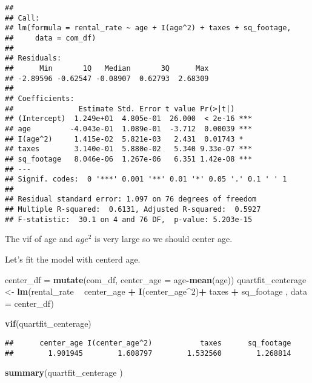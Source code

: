 \documentclass[]{article}
\newenvironment{Shaded}{\begin{snugshade}}{\end{snugshade}}
\newcommand{\DataTypeTok}[1]{\textcolor[rgb]{0.13,0.29,0.53}{#1}}
\newcommand{\DecValTok}[1]{\textcolor[rgb]{0.00,0.00,0.81}{#1}}
\newcommand{\KeywordTok}[1]{\textcolor[rgb]{0.13,0.29,0.53}{\textbf{#1}}}
\newcommand{\NormalTok}[1]{#1}
\newcommand{\OperatorTok}[1]{\textcolor[rgb]{0.81,0.36,0.00}{\textbf{#1}}}
\newcommand{\StringTok}[1]{\textcolor[rgb]{0.31,0.60,0.02}{#1}}
\begin{document}
\begin{verbatim}
## 
## Call:
## lm(formula = rental_rate ~ age + I(age^2) + taxes + sq_footage, 
##     data = com_df)
## 
## Residuals:
##      Min       1Q   Median       3Q      Max 
## -2.89596 -0.62547 -0.08907  0.62793  2.68309 
## 
## Coefficients:
##               Estimate Std. Error t value Pr(>|t|)    
## (Intercept)  1.249e+01  4.805e-01  26.000  < 2e-16 ***
## age         -4.043e-01  1.089e-01  -3.712  0.00039 ***
## I(age^2)     1.415e-02  5.821e-03   2.431  0.01743 *  
## taxes        3.140e-01  5.880e-02   5.340 9.33e-07 ***
## sq_footage   8.046e-06  1.267e-06   6.351 1.42e-08 ***
## ---
## Signif. codes:  0 '***' 0.001 '**' 0.01 '*' 0.05 '.' 0.1 ' ' 1
## 
## Residual standard error: 1.097 on 76 degrees of freedom
## Multiple R-squared:  0.6131, Adjusted R-squared:  0.5927 
## F-statistic:  30.1 on 4 and 76 DF,  p-value: 5.203e-15
\end{verbatim}

The vif of age and \(age^2\) is very large so we should center age.

Let's fit the model with centerd age.

\begin{Shaded}
\begin{Highlighting}[]
\NormalTok{center_df =}\StringTok{ }\KeywordTok{mutate}\NormalTok{(com_df, }\DataTypeTok{center_age =}\NormalTok{ age}\OperatorTok{-}\KeywordTok{mean}\NormalTok{(age))}
\NormalTok{quartfit_centerage <-}\StringTok{ }\KeywordTok{lm}\NormalTok{(rental_rate }\OperatorTok{~}\StringTok{ }\NormalTok{center_age }\OperatorTok{+}\StringTok{ }\KeywordTok{I}\NormalTok{(center_age}\OperatorTok{^}\DecValTok{2}\NormalTok{)}\OperatorTok{+}\StringTok{ }\NormalTok{taxes }\OperatorTok{+}\StringTok{ }\NormalTok{sq_footage , }\DataTypeTok{data =}\NormalTok{ center_df)}

\KeywordTok{vif}\NormalTok{(quartfit_centerage)}
\end{Highlighting}
\end{Shaded}

\begin{verbatim}
##      center_age I(center_age^2)           taxes      sq_footage 
##        1.901945        1.608797        1.532560        1.268814
\end{verbatim}

\begin{Shaded}
\begin{Highlighting}[]
\KeywordTok{summary}\NormalTok{(quartfit_centerage )}
\end{Highlighting}
\end{Shaded}
\end{document}
